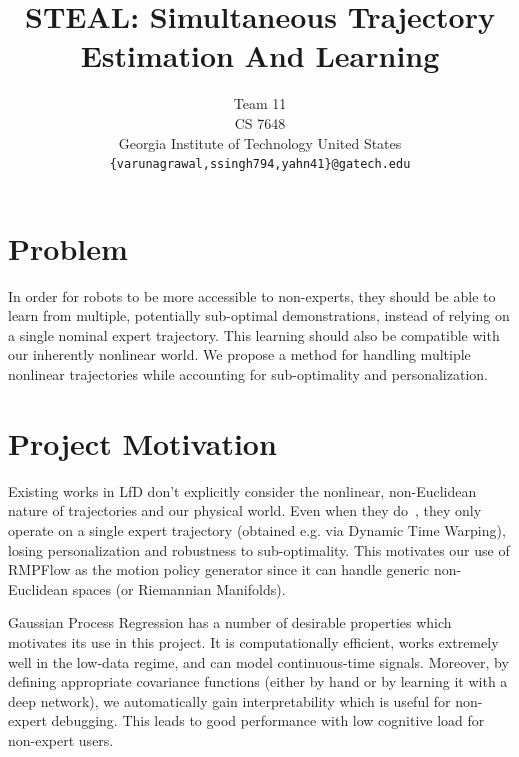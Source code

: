 \documentclass{article}
\title{STEAL: Simultaneous Trajectory Estimation And Learning \vspace{-1.5em}}
\author{
  Team 11\\
  CS 7648\\
  Georgia Institute of Technology
  United States\\
  \texttt{\{varunagrawal,ssingh794,yahn41\}@gatech.edu} \\
}
\begin{document}
\maketitle

\vspace{-3.5em}
\section{Problem}


In order for robots to be more accessible to non-experts, they should be able to learn from multiple, potentially sub-optimal demonstrations, instead of relying on a single nominal expert trajectory. This learning should also be compatible with our inherently nonlinear world.  We propose a method for handling multiple nonlinear trajectories while accounting for sub-optimality and personalization.

\vspace{-1em}
\section{Project Motivation}

Existing works in LfD don't explicitly consider the nonlinear, non-Euclidean nature of trajectories and our physical world. Even when they do~\cite{Rana20corl}, they only operate on a single expert trajectory (obtained e.g. via Dynamic Time Warping), losing personalization and robustness to sub-optimality.
This motivates our use of RMPFlow as the motion policy generator since it can handle generic non-Euclidean spaces (or Riemannian Manifolds).


Gaussian Process Regression has a number of desirable properties which motivates its use in this project. It is computationally efficient, works extremely well in the low-data regime, and can model continuous-time signals. Moreover, by defining appropriate covariance functions (either by hand or by learning it with a deep network), we automatically gain interpretability which is useful for non-expert debugging. This leads to good performance with low cognitive load for non-expert users.
\end{document}
